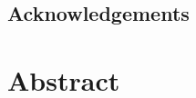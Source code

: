 \documentclass[a4paper,oneside,12pt]{book}
\begin{document}
\section*{\Huge{Acknowledgements}}


\singlespacing\justify
\chapter*{Abstract}


\onehalfspacing\raggedright %
\newpage

\tableofcontents
\listoffigures
\listoftables
\newpage


\justify
\mainmatter










\appendix
\renewcommand{\thechapter}{A\arabic{chapter}}

\end{document}
